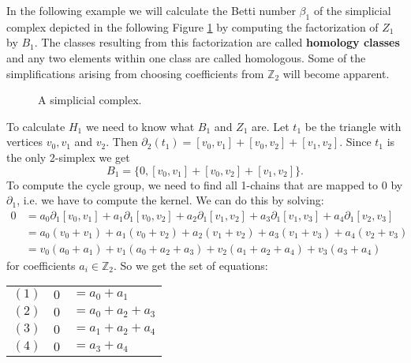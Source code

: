 In the following example we will calculate the Betti number $\beta_1$ of the simplicial complex depicted in the following Figure \ref{fig:simplicial_homology_example} by computing the factorization of $Z_1$ by $B_1$. The classes resulting from this factorization are called \textbf{homology classes} and any two elements within one class are called homologous. Some of the simplifications arising from choosing coefficients from $\mathbb{Z}_2$ will become apparent.

\begin{figure}[H]
\begin{subfigure}[c]{0.99\textwidth}
\begin{center}

\end{center}
\end{subfigure}
\caption{A simplicial complex.}
\label{fig:simplicial_homology_example}
\end{figure}

To calculate $H_1$ we need to know what $B_1$ and $Z_1$ are. Let $t_1$ be the triangle with vertices $v_0, v_1$ and $v_2$. Then $\partial_2(t_1) = [v_0,v_1] + [v_0,v_2] + [v_1,v_2]$. Since $t_1$ is the only 2-simplex we get
\[
B_1 = \{0, [v_0,v_1]+[v_0,v_2]+[v_1,v_2]\}.
\]
To compute the cycle group, we need to find all 1-chains that are mapped to $0$ by $\partial_1$, i.e. we have to compute the kernel. We can do this by solving:
\begin{equation*}
    \begin{split}
         0 &= a_0\partial_1[v_0,v_1] + a_1\partial_1[v_0,v_2] + a_2\partial_1[v_1,v_2] + a_3\partial_1[v_1,v_3] +a_4\partial_1[v_2,v_3]\\
    &= a_0(v_0+v_1) + a_1(v_0+v_2) + a_2(v_1+v_2) + a_3(v_1+v_3) + a_4(v_2+v_3) \\
    &= v_0(a_0+a_1) + v_1(a_0+a_2+a_3) + v_2(a_1+a_2+a_4) + v_3(a_3+a_4)
    \end{split}
\end{equation*}
for coefficients $a_i \in \mathbb{Z}_2$. So we get the set of equations: 
\begin{center}
    \begin{tabular}{ccl}
        $(1)$ & $0$ & $= a_0+a_1$\\
        $(2)$ & $0$ & $= a_0+a_2+a_3$\\
        $(3)$ & $0$ & $= a_1+a_2+a_4$\\
        $(4)$ & $0$ & $= a_3+a_4$
\end{tabular}
\end{center}

